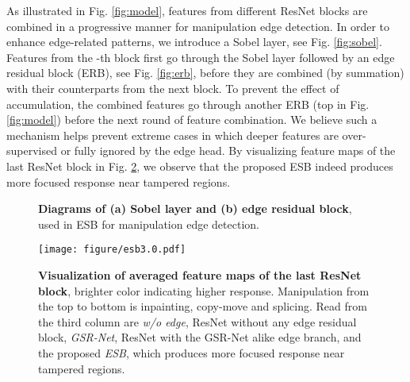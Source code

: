 As illustrated in Fig. \ref{fig:model}, features from different ResNet blocks are combined in a progressive manner for manipulation edge detection. In order to enhance edge-related patterns, we introduce a Sobel layer, see Fig. \ref{fig:sobel}. Features from the -th block first go through the Sobel layer followed by an edge residual block (ERB), see Fig. \ref{fig:erb}, before they are combined (by summation) with their counterparts from the next block. To prevent the effect of accumulation, the combined features go through another ERB (top in Fig. \ref{fig:model}) before the next round of feature combination. We believe such a mechanism helps prevent extreme cases in which deeper features are over-supervised or fully ignored by the edge head. By visualizing feature maps of the last ResNet block in Fig. \ref{fig:visual_esb}, we observe that the proposed ESB indeed produces  more focused response near tampered regions.  



\begin{figure}[htbp]
\begin{center}

\end{center}
\caption{\textbf{Diagrams of (a) Sobel layer and (b) edge residual block}, used in ESB for manipulation edge detection.}
\label{fig:sobel-erb}
\end{figure}

\begin{figure}[htpb]
    \begin{center}
    \texttt{[image: figure/esb3.0.pdf]}
    \end{center}
    \caption{\textbf{Visualization of averaged feature maps of the last ResNet block}, brighter color indicating  higher response.  Manipulation from the top to bottom is inpainting, copy-move and splicing. Read from the third column  are \textit{w/o edge}, \ie ResNet without any edge residual block, \textit{GSR-Net}, \ie ResNet with the GSR-Net alike edge branch, and the proposed \textit{ESB}, which produces  more focused response near tampered regions.}
    \label{fig:visual_esb}
\end{figure}









